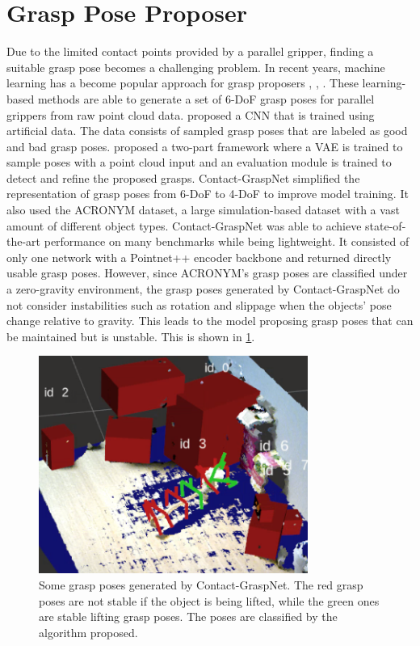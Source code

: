 \documentclass[12pt]{ucsddissertation}
\begin{document}
\section{Grasp Pose Proposer}
Due to the limited contact points provided by a parallel gripper, finding a suitable grasp pose becomes a challenging problem. In recent years, machine learning has a become popular approach for grasp proposers \cite{ten_Pas_Gualtieri_Saenko_Platt_2017}, \cite{Mousavian_Eppner_Fox_2019}, \cite{Sundermeyer_Mousavian_Triebel_Fox_2021}. These learning-based methods are able to generate a set of 6-DoF grasp poses for parallel grippers from raw point cloud data. \cite{ten_Pas_Gualtieri_Saenko_Platt_2017} proposed a CNN that is trained using artificial data. The data consists of sampled grasp poses that are labeled as good and bad grasp poses. \cite{Mousavian_Eppner_Fox_2019} proposed a two-part framework where a VAE is trained to sample poses with a point cloud input and an evaluation module is trained to detect and refine the proposed grasps. Contact-GraspNet\cite{Sundermeyer_Mousavian_Triebel_Fox_2021} simplified the representation of grasp poses from 6-DoF to 4-DoF to improve model training. It also used the ACRONYM \cite{Eppner_Mousavian_Fox_2021} dataset, a large simulation-based dataset with a vast amount of different object types. Contact-GraspNet was able to achieve state-of-the-art performance on many benchmarks while being lightweight. It consisted of only one network with a Pointnet++ \cite{Qi2017PointNetDH} encoder backbone and returned directly usable grasp poses. However, since ACRONYM's grasp poses are classified under a zero-gravity environment, the grasp poses generated by Contact-GraspNet do not consider instabilities such as rotation and slippage when the objects' pose change relative to gravity. This leads to the model proposing grasp poses that can be maintained but is unstable. This is shown in \ref{fig:exampleGrasps}.

\begin{figure}
	\centering
	\includegraphics[width=250pt]{figures/grasps.png}
	\caption[Sample grasps from Contact-GraspNet]{Some grasp poses generated by Contact-GraspNet. The red grasp poses are not stable if the object is being lifted, while the green ones are stable lifting grasp poses. The poses are classified by the algorithm proposed.}
	\label{fig:exampleGrasps}
\end{figure}
\end{document}
